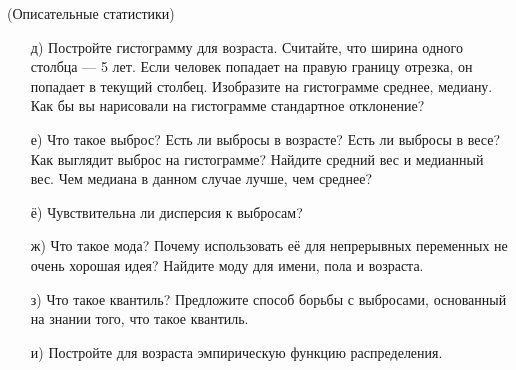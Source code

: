 \documentclass[12pt, a4paper, oneside]{article}
\begin{document}
\begin{problem}{(Описательные статистики)}
\begin{enumerate}
	\item[д)]  Постройте гистограмму для возраста. Считайте, что ширина одного столбца --- 5 лет. Если человек попадает на правую границу отрезка, он попадает в текущий столбец.  Изобразите на гистограмме среднее, медиану. Как бы вы нарисовали на гистограмме стандартное отклонение? 
	
	\item[е)] Что такое выброс? Есть ли выбросы в возрасте? Есть ли выбросы в весе? Как выглядит выброс на гистограмме? Найдите средний вес и медианный вес. Чем медиана в данном случае лучше, чем среднее?
	
	\item[ё)] Чувствительна ли дисперсия к выбросам?
	
	\item[ж)] Что такое мода? Почему использовать её для непрерывных переменных не очень хорошая идея? Найдите моду для имени, пола и возраста.
	
	\item[з)]  Что такое квантиль? Предложите способ  борьбы с выбросами, основанный на знании того, что такое квантиль.
	
	\item[и)] Постройте для возраста эмпирическую функцию распределения.
	
\end{enumerate}
\end{problem}
\end{document}
